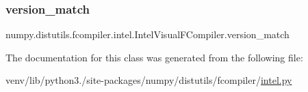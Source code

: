 \subsubsection{\texorpdfstring{version\+\_\+match}{version\_match}}
{\footnotesize\ttfamily numpy.\+distutils.\+fcompiler.\+intel.\+Intel\+Visual\+F\+Compiler.\+version\+\_\+match\hspace{0.3cm}{\ttfamily [static]}}



The documentation for this class was generated from the following file\+:\begin{DoxyCompactItemize}
\item 
venv/lib/python3./site-\/packages/numpy/distutils/fcompiler/\hyperlink{intel_8py}{intel.\+py}\end{DoxyCompactItemize}
